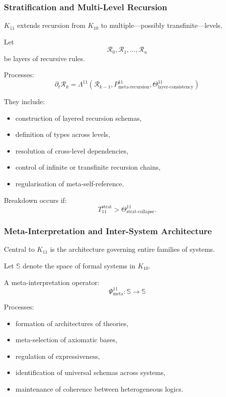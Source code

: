 \subsubsection{Stratification and Multi-Level Recursion}

$K_{11}$ extends recursion from $K_{10}$ to multiple—possibly transfinite—levels.

Let 
\[
\mathcal{R}_0, \mathcal{R}_1, \ldots, \mathcal{R}_n
\]
be layers of recursive rules.

Processes:
\[
\partial_t \mathcal{R}_k 
= \Lambda^{11}(\mathcal{R}_{k-1}, 
               P^{11}_{\text{meta-recursion}}, 
               \Theta^{11}_{\text{layer-consistency}})
\]

They include:
\begin{itemize}
    \item construction of layered recursion schemas,
    \item definition of types across levels,
    \item resolution of cross-level dependencies,
    \item control of infinite or transfinite recursion chains,
    \item regularisation of meta-self-reference.
\end{itemize}

Breakdown occurs if:
\[
T_{11}^{\text{strat}} > \Theta^{11}_{\text{strat-collapse}}.
\]

\subsubsection{Meta-Interpretation and Inter-System Architecture}

Central to $K_{11}$ is the architecture governing entire families of systems.

Let $\mathbb{S}$ denote the space of formal systems in $K_{10}$.

A meta-interpretation operator:
\[
\Psi^{11}_{\text{meta}} : \mathbb{S} \to \mathbb{S}
\]

Processes:
\begin{itemize}
    \item formation of architectures of theories,
    \item meta-selection of axiomatic bases,
    \item regulation of expressiveness,
    \item identification of universal schemas across systems,
    \item maintenance of coherence between heterogeneous logics.
\end{itemize}

